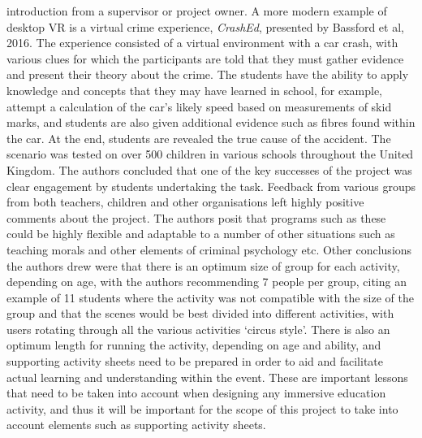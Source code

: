 \documentclass[11pt]{report}
\begin{document}
introduction from a supervisor or project owner. A more modern example of desktop VR is a virtual crime experience, \textit{CrashEd}, presented by Bassford et al, 2016\cite{Bassford2016}. The experience consisted of a virtual environment with a car crash, with various clues for which the participants are told that they must gather evidence and present their theory about the crime. The students have the ability to apply knowledge and concepts that they may have learned in school, for example, attempt a calculation of the car's likely speed based on measurements of skid marks, and students are also given additional evidence such as fibres found within the car. At the end, students are revealed the true cause of the accident. The scenario was tested on over 500 children in various schools throughout the United Kingdom. The authors concluded that one of the key successes of the project was clear engagement by students undertaking the task. Feedback from various groups from both teachers, children and other organisations left highly positive comments about the project. The authors posit that programs such as these could be highly flexible and adaptable to a number of other situations such as teaching morals and other elements of criminal psychology etc. Other conclusions the authors drew were that there is an optimum size of group for each activity, depending on age, with the authors recommending 7 people per group, citing an example of 11 students where the activity was not compatible with the size of the group and that the scenes would be best divided into different activities, with users rotating through all the various activities `circus style'. There is also an optimum length for running the activity, depending on age and ability, and supporting activity sheets need to be prepared in order to aid and facilitate actual learning and understanding within the event. These are important lessons that need to be taken into account when designing any immersive education activity, and thus it will be important for the scope of this project to take into account elements such as supporting activity sheets. 
\end{document}

